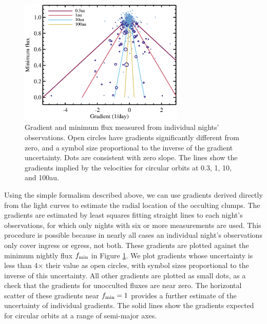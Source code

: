 \documentclass[]{rsos}
\begin{document}
\begin{figure}
  \begin{center}
    \hspace{-0.5cm} \includegraphics[width=0.7\textwidth]{figs/gradients.eps}
    \caption{Gradient and minimum flux measured from individual nights'
      observations. Open circles have gradients significantly different from zero, and a
      symbol size proportional to the inverse of the gradient uncertainty. Dots are
      consistent with zero slope. The lines show the gradients implied by the velocities
      for circular orbits at 0.3, 1, 10, and 100au.}\label{fig:grad}
  \end{center}
\end{figure}

Using the simple formalism described above, we can use gradients derived directly from
the light curves to estimate the radial location of the occulting clumps. The gradients
are estimated by least squares fitting straight lines to each night's observations, for
which only nights with six or more measurements are used. This procedure is possible
because in nearly all cases an individual night's observations only cover ingress or
egress, not both. These gradients are plotted against the minimum nightly flux
$f_{\rm min}$ in Figure \ref{fig:grad}. We plot gradients whose uncertainty is less than
4$\times$ their value as open circles, with symbol sizes proportional to the inverse of
this uncertainty. All other gradients are plotted as small dots, as a check that the
gradients for unocculted fluxes are near zero. The horizontal scatter of these gradients
near $f_{\rm min}=1$ provides a further estimate of the uncertainty of individual
gradients. The solid lines show the gradients expected for circular orbits at a range of
semi-major axes.
\end{document}
